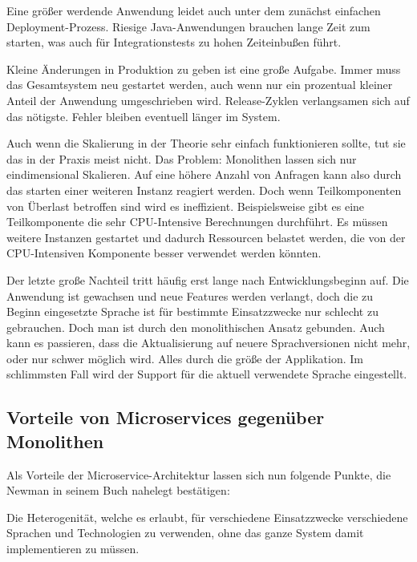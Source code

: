 \documentclass[12pt,a4paper,bibliography=totocnumbered,listof=totocnumbered]{scrartcl}
\begin{document}
Eine größer werdende Anwendung leidet auch unter dem zunächst einfachen Deployment-Prozess. Riesige Java-Anwendungen brauchen lange Zeit zum starten, was auch für Integrationstests zu hohen Zeiteinbußen führt.

Kleine Änderungen in Produktion zu geben ist eine große Aufgabe. Immer muss das Gesamtsystem neu gestartet werden, auch wenn nur ein prozentual kleiner Anteil der Anwendung umgeschrieben wird. Release-Zyklen verlangsamen sich auf das nötigste. Fehler bleiben eventuell länger im System.

Auch wenn die Skalierung in der Theorie sehr einfach funktionieren sollte, tut sie das in der Praxis meist nicht. Das Problem: Monolithen lassen sich nur eindimensional Skalieren. Auf eine höhere Anzahl von Anfragen kann also durch das starten einer weiteren Instanz reagiert werden. Doch wenn Teilkomponenten von Überlast betroffen sind wird es ineffizient. Beispielsweise gibt es eine Teilkomponente die sehr CPU-Intensive Berechnungen durchführt. Es müssen weitere Instanzen gestartet und dadurch Ressourcen belastet werden, die von der CPU-Intensiven Komponente besser verwendet werden könnten.


Der letzte große Nachteil tritt häufig erst lange nach Entwicklungsbeginn auf. Die Anwendung ist gewachsen und neue Features werden verlangt, doch die zu Beginn eingesetzte Sprache ist für bestimmte Einsatzzwecke nur schlecht zu gebrauchen. Doch man ist durch den monolithischen Ansatz gebunden. Auch kann es passieren, dass die Aktualisierung auf neuere Sprachversionen nicht mehr, oder nur schwer möglich wird. Alles durch die größe der Applikation. Im schlimmsten Fall wird der Support für die aktuell verwendete Sprache eingestellt.\cite{richardson}

\subsection{Vorteile von Microservices gegenüber Monolithen}\label{ch:ms-mon-pro}

Als Vorteile der Microservice-Architektur lassen sich nun folgende Punkte, die Newman in seinem Buch nahelegt bestätigen\cite{buildingms}:

Die Heterogenität, welche es erlaubt, für verschiedene Einsatzzwecke verschiedene Sprachen und Technologien zu verwenden, ohne das ganze System damit implementieren zu müssen.
\end{document}
